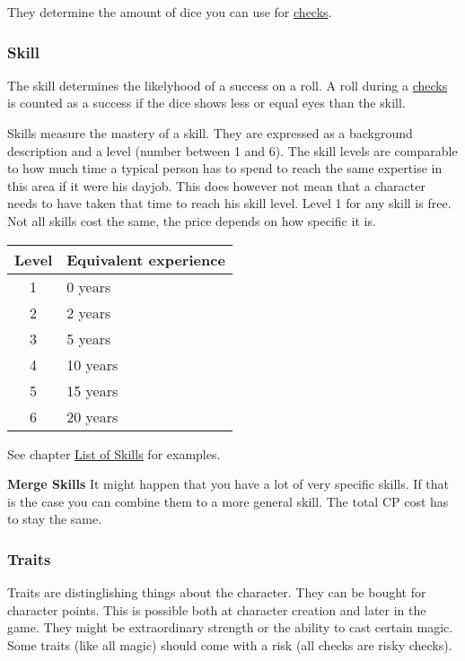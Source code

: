 \documentclass[11pt]{article}
\begin{document}
{\begin{multicols}{2}[]
They determine the amount of dice you can use for \hyperref[sec:org06f1f9d]{checks}. 

\subsubsection{Skill}
\label{sec:org01720e6}
The skill determines the likelyhood of a success on a roll. A roll during a \hyperref[sec:org06f1f9d]{checks} is counted as a success if the dice shows less or equal eyes than the skill.

Skills measure the mastery of a skill. They are expressed as a background description and a level (number between 1 and 6). The skill levels are comparable to how much time a typical person has to spend to reach the same expertise in this area if it were his dayjob. This does however not mean that a character needs to have taken that time to reach his skill level. Level 1 for any skill is free. Not all skills cost the same, the price depends on how specific it is.

\begin{center}
\begin{tabular}{c|l}
\textbf{Level} & \textbf{Equivalent experience}\\
\hline
1 & 0 years\\
2 & 2 years\\
3 & 5 years\\
4 & 10 years\\
5 & 15 years\\
6 & 20 years\\
\end{tabular}
\end{center}

See chapter \hyperref[sec:orgbc18f3a]{List of Skills} for examples.

\textbf{Merge Skills}
It might happen that you have a lot of very specific skills. If that is the case you can combine them to a more general skill. The total CP cost has to stay the same.

\subsubsection{Traits}
\label{sec:org8360d54}
Traits are distinglishing things about the character. They can be bought for character points. This is possible both at character creation and later in the game.
 They might be extraordinary strength or the ability to cast certain magic. Some traits (like all magic) should come with a risk (all checks are risky checks). 


\end{multicols}}
\end{document}
